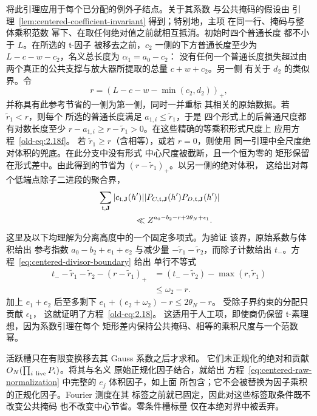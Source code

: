 将此引理应用于每个已分配的例外子结点。关于其系数
与公共掩码的假设由
引理~\ref{lem:centered-coefficient-invariant} 得到；特别地，主项
在同一行、掩码与整体乘积范数
幂下、在取任何绝对值之前就相互抵消。初始时四个普通长度
都不小于 \(L\)。在所选的 \(\mathfrak t\)-因子
被移去之前，\(c_2\) 一侧的下方普通长度至少为
\(L-c-w-c_2\)，名义总长度为 \(\alpha_1=a_0-c_2\)：
没有任何一个普通长度损失超过由
两个真正的公共支撑与放大器所提取的总量 \(c+w+c_2\)。另一侧
有关于 \(d_2\) 的类似界。令
\[
 r=(L-c-w-\min(c_2,d_2))_+,
\]
并称具有此参考节省的一侧为第一侧，同时一并重标
其相关的原始数据。若 \(\widetilde r_1<r\)，则每个
所选的普通长度满足 \(a_{1,i}\le\widetilde r_1\)，于是
四个形式上的后普通尺度都有对数长度至少
\(r-a_{1,i}\ge r-\widetilde r_1>0\)。在这些精确的等乘积形式尺度上
应用方程~\eqref{old-eq:2.18f}。
若 \(\widetilde r_1\ge r\)（含相等），或若 \(r=0\)，则使用
同一引理中全尺度绝对体积的兜底。在此分支中没有形式
中心尺度被截断，且一个恒为零的
矩形保留在形式差中。由此得到的节省为
\((r-\widetilde r_1)_+\)。以另一侧的绝对体积，
这给出对每个低端点除子二进段的聚合界，
\begin{equation}
 \begin{split}
 &\sum_{\mathfrak t,\mathbf J}
 |c_{\mathfrak t,\mathbf J}(h')|
 |P_{C,\mathfrak t,\mathbf J}(h')
       P_{D,\mathfrak t,\mathbf J}(h')|\\
 &\hspace{15mm}\ll
 Z^{a_0-b_2-r+2\theta_N+\epsilon_1}.
 \end{split}
 \label{old-eq:2.18}
\end{equation}
这里及以下均理解为分离高度中的一个固定多项式。为验证
该界，原始系数与体积给出
参考指数 \(a_0-b_2+e_1+e_2\) 与减少量
\(-\widetilde r_1-\widetilde r_2\)，而除子计数给出
\(t_-\)。方程~\eqref{eq:centered-divisor-boundary} 给出
单行不等式
\begin{equation}
 \begin{split}
 t_- -\widetilde r_1-\widetilde r_2-(r-\widetilde r_1)_+
 &=(t_- -\widetilde r_2)-\max(r,\widetilde r_1)\\
 &\le\omega_2-r.
 \end{split}
 \label{old-eq:2.18h}
\end{equation}
加上 \(e_1+e_2\) 后至多剩下
\(e_1+(e_2+\omega_2)-r\le2\theta_N-r\)。
受除子界约束的分配只贡献 \(\epsilon_1\)，
这就证明了方程~\eqref{old-eq:2.18}。
这适用于人工项，即使商仍保留
\(\mathfrak t\)-素理想，因为系数引理在每个
矩形差内保持公共掩码、相等的乘积尺度与一个范数幂。

活跃槽只在有限变换移去其 Gauss 系数之后才求和。
它们未正规化的绝对和贡献
\(O_N(\prod_{i\ {\rm live}}P_i)\)。将其与名义
原始正规化因子结合，就给出
方程~\eqref{eq:centered-raw-normalization} 中完整的 \(e_j\) 体积因子，如上面
所包含；它不会被替换为因子乘积的正规化因子。Fourier 测度在其
标签之前就已固定，因此对这些标签取条件既不改变公共掩码
也不改变中心节省。零条件槽标量
仅在本绝对界中被丢弃。


